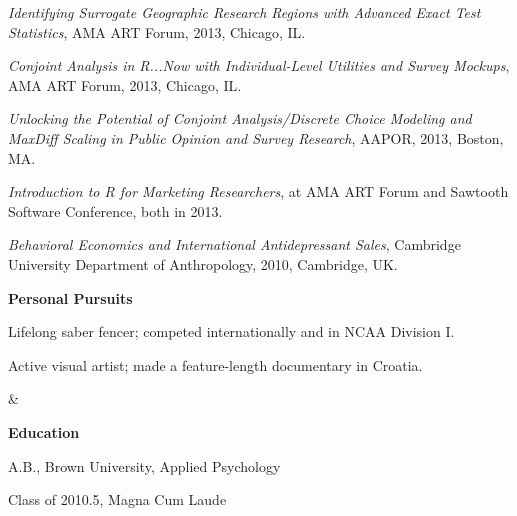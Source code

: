 \documentclass{res}
\begin{document}
{\begin{resume}
\begin{minipage}{7.6in}
\begin{list}{}{%
     \setlength{\labelwidth}{0pt}%
     \setlength{\itemsep}{-2pt}%
     \setlength{\leftmargin}{1em}%
     \setlength{\itemindent}{-1em}%
   }
\item {\it Identifying Surrogate Geographic Research Regions with Advanced Exact Test Statistics}, AMA ART Forum, 2013, Chicago, IL.%
\item {\it Conjoint Analysis in R...Now with Individual-Level Utilities and Survey Mockups}, AMA ART Forum, 2013, Chicago, IL.%
\item {\it Unlocking the Potential of Conjoint Analysis/Discrete Choice Modeling and MaxDiff Scaling in Public Opinion and Survey Research}, AAPOR, 2013, Boston, MA.
\item {\it Introduction to R for Marketing Researchers}, at AMA ART Forum and Sawtooth Software Conference, both in 2013.
\item {\it Behavioral Economics and International Antidepressant Sales}, Cambridge University Department of Anthropology, 2010, Cambridge, UK.
\end{list}

\vspace{8mm}

\begin{tabular}{{}{}}
\hspace{-2.75mm}
{\begin{minipage}{4.7in}
\textbf{Personal Pursuits\hspace{2mm}}\hrulefill
\vspace{1.5mm}
\begin{list}{}{\leftmargin=0em}\itemsep-2pt
\item Lifelong saber fencer; competed internationally and in NCAA Division I.
\item Active visual artist; made a feature-length documentary in Croatia.
\end{list}
\end{minipage}}
&
{\begin{minipage}{2.75in}
\textbf{Education\hspace{2mm}}\hrulefill
\vspace{1.4mm}
\begin{list}{}{\leftmargin=0em}\itemsep-2pt
\item A.B., Brown University, Applied Psychology
\item Class of 2010.5, Magna Cum Laude
\end{list}
\end{minipage}}
\end{tabular}


\end{minipage}
\end{resume}}
\end{document}
